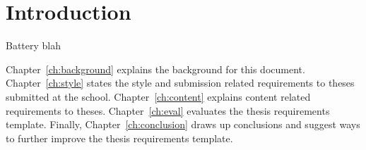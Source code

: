 \chapter{Introduction}\label{ch:intro}

Battery blah

Chapter~\ref{ch:background} explains the background for this document.
Chapter~\ref{ch:style} states the style and submission related requirements
to theses submitted at the school.
Chapter~\ref{ch:content} explains content related requirements to theses.
Chapter~\ref{ch:eval} evaluates the thesis requirements template.  Finally,
Chapter~\ref{ch:conclusion} draws up conclusions and suggest ways to
further improve the thesis requirements template.

